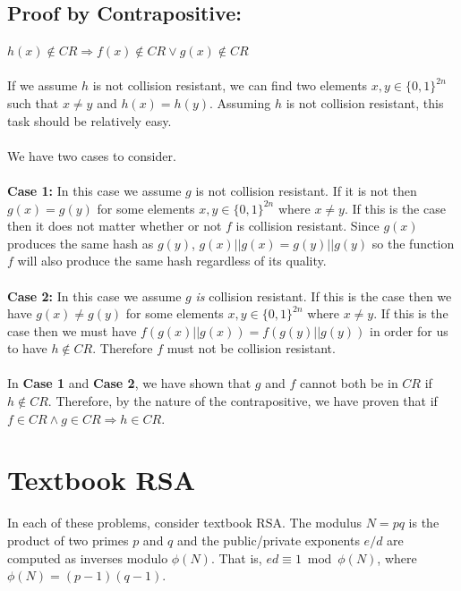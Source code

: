 \documentclass[12pt, letterpaper]{article}
\begin{document}
\subsection{Proof by Contrapositive:}
$h(x) \notin CR \Rightarrow f(x) \notin CR \lor g(x) \notin CR$
~\\~\\
If we assume $h$ is not collision resistant, we can find two elements $x, y \in \{0, 1\}^{2n}$ such that $x \neq y$ and $h(x) = h(y)$. Assuming $h$ is not collision resistant, this task should be relatively easy. 
~\\~\\
We have two cases to consider.
~\\~\\
\textbf{Case 1:}
In this case we assume $g$ is not collision resistant. If it is not then $g(x) = g(y)$ for some elements $x, y \in \{0, 1\}^{2n}$ where $x \neq y$. If this is the case then it does not matter whether or not $f$ is collision resistant. Since $g(x)$ produces the same hash as $g(y)$, $g(x)||g(x) = g(y)||g(y)$ so the function $f$ will also produce the same hash regardless of its quality. 
~\\~\\
\textbf{Case 2:}
In this case we assume $g$ \textit{is} collision resistant. If this is the case then we have $g(x) \neq g(y)$ for some elements $x, y \in \{0, 1\}^{2n}$ where $x \neq y$. If this is the case then we must have $f(g(x)||g(x)) = f(g(y)||g(y))$ in order for us to have $h \notin CR$. Therefore $f$ must not be collision resistant.
~\\~\\
In \textbf{Case 1} and \textbf{Case 2}, we have shown that $g$ and $f$ cannot both be in $CR$ if $h \notin CR$. Therefore, by the nature of the contrapositive, we have proven that if $f \in CR \land g \in CR \Rightarrow h \in CR$.

\newpage

\section{Textbook RSA}

In each of these problems, consider textbook RSA.  
The modulus $N = pq$ is the product of two primes $p$ and $q$ and the public/private exponents $e/d$ are computed
as inverses modulo $\phi(N)$.  That is, $ed \equiv 1 \bmod {\phi(N)}$, where $\phi(N) = (p-1)(q-1)$.
\end{document}
